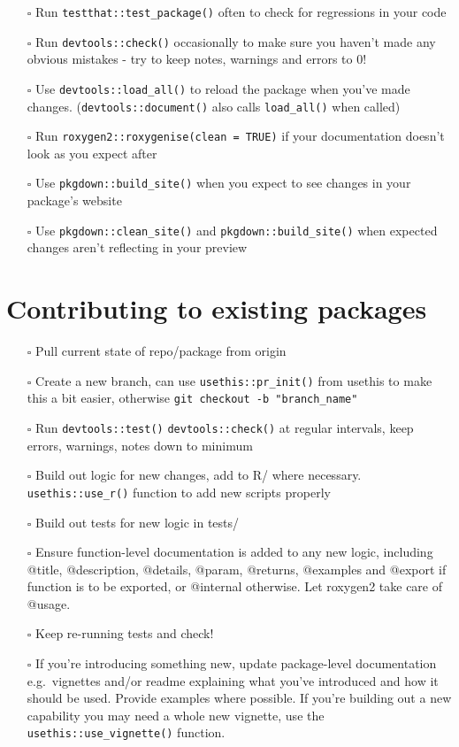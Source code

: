 \documentclass[
  letterpaper,
  DIV=11,
  numbers=noendperiod]{scrreprt}
\providecommand{\tightlist}{%
  \setlength{\itemsep}{0pt}\setlength{\parskip}{0pt}}\usepackage{longtable,booktabs,array}
\begin{document}
\begin{itemize}
\tightlist
\item[$\square$]
  Run \texttt{testthat::test\_package()} often to check for regressions
  in your code
\item[$\square$]
  Run \texttt{devtools::check()} occasionally to make sure you haven't
  made any obvious mistakes - try to keep notes, warnings and errors to
  0!
\item[$\square$]
  Use \texttt{devtools::load\_all()} to reload the package when you've
  made changes. (\texttt{devtools::document()} also calls
  \texttt{load\_all()} when called)
\item[$\square$]
  Run \texttt{roxygen2::roxygenise(clean\ =\ TRUE)} if your
  documentation doesn't look as you expect after
\item[$\square$]
  Use \texttt{pkgdown::build\_site()} when you expect to see changes in
  your package's website
\item[$\square$]
  Use \texttt{pkgdown::clean\_site()} and
  \texttt{pkgdown::build\_site()} when expected changes aren't
  reflecting in your preview
\end{itemize}

\section{Contributing to existing
packages}\label{contributing-to-existing-packages}

\begin{itemize}
\item[$\square$]
  Pull current state of repo/package from origin
\item[$\square$]
  Create a new branch, can use \texttt{usethis::pr\_init()} from usethis
  to make this a bit easier, otherwise
  \texttt{git\ checkout\ -b\ "branch\_name"}
\item[$\square$]
  Run \texttt{devtools::test()} \texttt{devtools::check()} at regular
  intervals, keep errors, warnings, notes down to minimum
\item[$\square$]
  Build out logic for new changes, add to R/ where necessary.
  \texttt{usethis::use\_r()} function to add new scripts properly
\item[$\square$]
  Build out tests for new logic in tests/
\item[$\square$]
  Ensure function-level documentation is added to any new logic,
  including @title, @description, @details, @param, @returns, @examples
  and @export if function is to be exported, or @internal otherwise. Let
  roxygen2 take care of @usage.
\item[$\square$]
  Keep re-running tests and check!
\item[$\square$]
  If you're introducing something new, update package-level
  documentation e.g.~vignettes and/or readme explaining what you've
  introduced and how it should be used. Provide examples where possible.
  If you're building out a new capability you may need a whole new
  vignette, use the \texttt{usethis::use\_vignette()} function.
\end{itemize}
\end{document}
